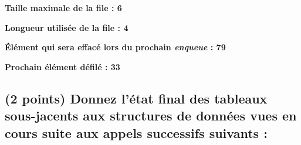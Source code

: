 \documentclass[11pt,a4paper]{article}
\begin{document}
\begin{center}
\begin{table}[ht!]
  \centering
  \begin{minipage}{0.4\textwidth}

\textbf{Taille maximale de la file :  \hspace*{0.25cm }  6}

\bigskip

\textbf{Longueur utilisée de la file :  \hspace*{0.25cm }  4}

  \end{minipage}
  \hfillx
  \begin{minipage}{0.6\textwidth}

\textbf{\'Elément qui sera effacé lors du prochain \textit{enqueue} :    79}

\bigskip

\textbf{Prochain élément défilé :  \hspace*{0.25cm }  33}

  \end{minipage}
\end{table}
\end{center}


\bigskip



\bigskip
\bigskip


\subsection{(2 points) Donnez l'état final des tableaux sous-jacents aux structures de données vues en cours suite aux appels successifs suivants : }
\end{document}
